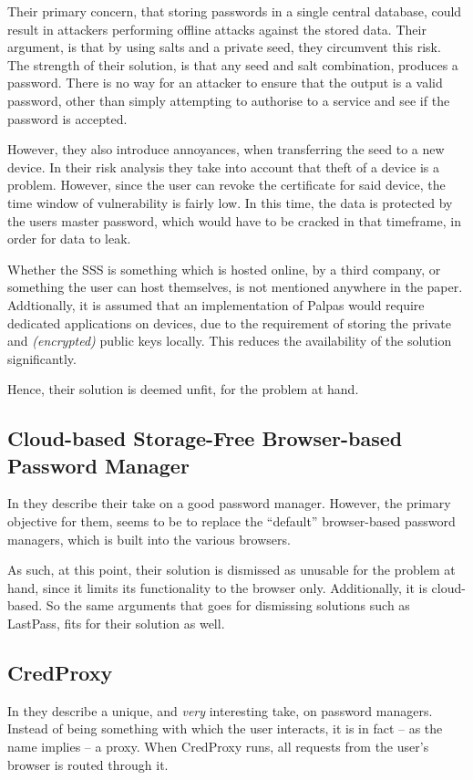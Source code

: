 			Their primary concern, that storing passwords in a single central database, could result in attackers performing offline attacks against the stored data. Their argument, is that by using salts and a private seed, they circumvent this risk. The strength of their solution, is that any seed and salt combination, produces a password. There is no way for an attacker to ensure that the output is a valid password, other than simply attempting to authorise to a service and see if the password is accepted.

			However, they also introduce annoyances, when transferring the seed to a new device. In their risk analysis they take into account that theft of a device is a problem. However, since the user can revoke the certificate for said device, the time window of vulnerability is fairly low. In this time, the data is protected by the users master password, which would have to be cracked in that timeframe, in order for data to leak.

			Whether the SSS is something which is hosted online, by a third company, or something the user can host themselves, is not mentioned anywhere in the paper. Addtionally, it is assumed that an implementation of Palpas would require dedicated applications on devices, due to the requirement of storing the private and \emph{(encrypted)} public keys locally. This reduces the availability of the solution significantly.

			Hence, their solution is deemed unfit, for the problem at hand.

		\subsection*{Cloud-based Storage-Free Browser-based Password Manager}
			In \cite{zhao2014} they describe their take on a good password manager. However, the primary objective for them, seems to be to replace the ``default'' browser-based password managers, which is built into the various browsers.

			As such, at this point, their solution is dismissed as unusable for the problem at hand, since it limits its functionality to the browser only. Additionally, it is cloud-based. So the same arguments that goes for dismissing solutions such as LastPass, fits for their solution as well. 

		\subsection*{CredProxy}
			In \cite{golrang2012} they describe a unique, and \emph{very} interesting take, on password managers. Instead of being something with which the user interacts, it is in fact -- as the name implies -- a proxy. When CredProxy runs, all requests from the user's browser is routed through it. 


